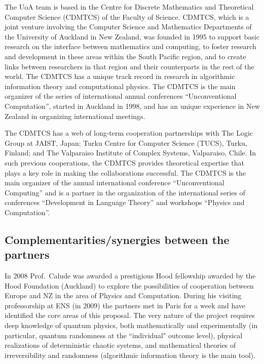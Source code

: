 \documentclass[12pt]{article}
\begin{document}
The  UoA team is based in the Centre for Discrete Mathematics and Theoretical Computer Science (CDMTCS) of the Faculty of Science. CDMTCS, which
is a joint venture involving the Computer Science and Mathematics Departments of the University of Auckland in New Zealand, was founded in 1995 to support basic research on the interface between mathematics and computing, to foster research and development in these areas within the South Pacific region, and to create links between researchers in that region and their counterparts in the rest of the world. The CDMTCS has a unique track record in research in algorithmic information theory and computational physics. The CDMTCS is the main organizer of the series of international annual conferences ``Unconventional Computation'', started in Auckland in 1998, and has an unique experience in New Zealand in organizing
international meetings.

The CDMTCS has a web of long-term cooperation partnerships with
The Logic Group at JAIST, Japan;
Turku Centre for Computer Science (TUCS), Turku, Finland; and
The Valparaiso Institute of Complex Systems, Valparaiso, Chile. In such previous cooperations, the CDMTCS provides theoretical expertise that plays a key role in making the collaborations successful.
The CDMTCS
is the main organizer of the annual international conference ``Unconventional Computing'' and is a partner in the organization of the international series of conferences
``Development in Language Theory'' and workshops ``Physics and Computation''.





\subsection{Complementarities/synergies between the partners}

In 2008 Prof.\ Calude was awarded a prestigious Hood fellowship awarded by the Hood Foundation (Auckland) to explore the possibilities of cooperation between Europe and NZ in the area of Physics and Computation. During his visiting professorship at ENS (in 2009) the partners  met in Paris for a week and have identified the core areas of this proposal. The very nature of the project requires deep knowledge of quantum physics, both mathematically and experimentally (in particular, quantum randomness at the ``individual" outcome level), physical realizations of deterministic chaotic systems, and mathematical theories of irreversibility and randomness (algorithmic information theory is the main tool).
\end{document}
